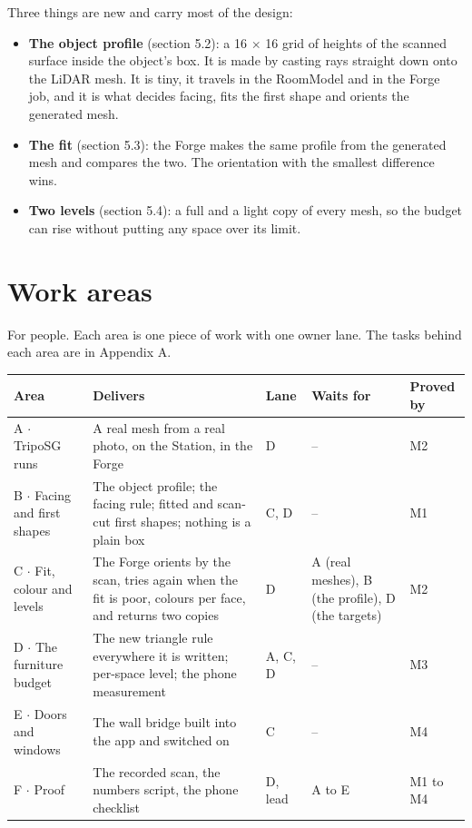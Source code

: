 \documentclass[10pt]{article}
\newcommand{\hd}[1]{\textbf{#1}}
\begin{document}
Three things are new and carry most of the design:
\begin{itemize}
\item \textbf{The object profile} (section 5.2): a 16 $\times$ 16 grid of heights of the scanned surface inside the object's box.
It is made by casting rays straight down onto the LiDAR mesh. It is tiny, it travels in the RoomModel and in the Forge job,
and it is what decides facing, fits the first shape and orients the generated mesh.
\item \textbf{The fit} (section 5.3): the Forge makes the same profile from the generated mesh and compares the two. The
orientation with the smallest difference wins.
\item \textbf{Two levels} (section 5.4): a full and a light copy of every mesh, so the budget can rise without putting any
space over its limit.
\end{itemize}

\needspace{75mm}
\section{Work areas}

For people. Each area is one piece of work with one owner lane. The tasks behind each area are in Appendix A.

{\small
\begin{longtable}{@{}L{35mm}L{64mm}L{11mm}L{35mm}L{21mm}@{}}
\toprule
\hd{Area} & \hd{Delivers} & \hd{Lane} & \hd{Waits for} & \hd{Proved by}\\
\midrule
\endhead
A $\cdot$ TripoSG runs & A real mesh from a real photo, on the Station, in the Forge & D & -- & M2\\
B $\cdot$ Facing and first shapes & The object profile; the facing rule; fitted and scan-cut first shapes; nothing is a plain
box & C, D & -- & M1\\
C $\cdot$ Fit, colour and levels & The Forge orients by the scan, tries again when the fit is poor, colours per face, and
returns two copies & D & A (real meshes), B (the profile), D (the targets) & M2\\
D $\cdot$ The furniture budget & The new triangle rule everywhere it is written; per-space level; the phone measurement &
A, C, D & -- & M3\\
E $\cdot$ Doors and windows & The wall bridge built into the app and switched on & C & -- & M4\\
F $\cdot$ Proof & The recorded scan, the numbers script, the phone checklist & D, lead & A to E & M1 to M4\\
\bottomrule
\end{longtable}}
\end{document}
